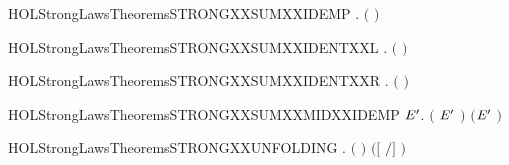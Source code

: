 \newcommand{\HOLStrongLawsTheoremsSTRONGXXSUMXXCOMM}{\UseVerbatim{HOLStrongLawsTheoremsSTRONGXXSUMXXCOMM}}
\begin{SaveVerbatim}{HOLStrongLawsTheoremsSTRONGXXSUMXXIDEMP}
\HOLTokenTurnstile{} \HOLSymConst{\HOLTokenForall{}}.  \ensuremath{(} \HOLSymConst{\ensuremath{+}} \ensuremath{)} 
\end{SaveVerbatim}
\newcommand{\HOLStrongLawsTheoremsSTRONGXXSUMXXIDEMP}{\UseVerbatim{HOLStrongLawsTheoremsSTRONGXXSUMXXIDEMP}}
\begin{SaveVerbatim}{HOLStrongLawsTheoremsSTRONGXXSUMXXIDENTXXL}
\HOLTokenTurnstile{} \HOLSymConst{\HOLTokenForall{}}.  \ensuremath{(} \HOLSymConst{\ensuremath{+}} \ensuremath{)} 
\end{SaveVerbatim}
\newcommand{\HOLStrongLawsTheoremsSTRONGXXSUMXXIDENTXXL}{\UseVerbatim{HOLStrongLawsTheoremsSTRONGXXSUMXXIDENTXXL}}
\begin{SaveVerbatim}{HOLStrongLawsTheoremsSTRONGXXSUMXXIDENTXXR}
\HOLTokenTurnstile{} \HOLSymConst{\HOLTokenForall{}}.  \ensuremath{(} \HOLSymConst{\ensuremath{+}} \ensuremath{)} 
\end{SaveVerbatim}
\newcommand{\HOLStrongLawsTheoremsSTRONGXXSUMXXIDENTXXR}{\UseVerbatim{HOLStrongLawsTheoremsSTRONGXXSUMXXIDENTXXR}}
\begin{SaveVerbatim}{HOLStrongLawsTheoremsSTRONGXXSUMXXMIDXXIDEMP}
\HOLTokenTurnstile{} \HOLSymConst{\HOLTokenForall{}} \ensuremath{\HOLBoundVar{E}\sp{\prime{}}}.  \ensuremath{(} \HOLSymConst{\ensuremath{+}} \ensuremath{\HOLBoundVar{E}\sp{\prime{}}} \HOLSymConst{\ensuremath{+}} \ensuremath{)} \ensuremath{(}\ensuremath{\HOLBoundVar{E}\sp{\prime{}}} \HOLSymConst{\ensuremath{+}} \ensuremath{)}
\end{SaveVerbatim}
\newcommand{\HOLStrongLawsTheoremsSTRONGXXSUMXXMIDXXIDEMP}{\UseVerbatim{HOLStrongLawsTheoremsSTRONGXXSUMXXMIDXXIDEMP}}
\begin{SaveVerbatim}{HOLStrongLawsTheoremsSTRONGXXUNFOLDING}
\HOLTokenTurnstile{} \HOLSymConst{\HOLTokenForall{}} .  \ensuremath{(}  \ensuremath{)} \ensuremath{(}\ensuremath{[}  \ensuremath{/}\ensuremath{]} \ensuremath{)}
\end{SaveVerbatim}
